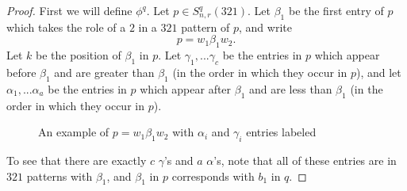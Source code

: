 \documentclass[11pt]{amsart}
\theoremstyle{remark}
\numberwithin{equation}{section}
\begin{document}
\begin{proof}
    First we will define $\phi^q$. Let $p \in S_{n,r}^{q}(321)$. Let $\beta_1$ be the first entry of $p$ which takes the role of a $2$ in a $321$ pattern of $p$, and write 
    \[
    p = w_1 \beta_1 w_2.
    \]
     Let $k$ be the position of $\beta_1$ in $p$. Let $\gamma_1, ... \gamma_c$ be the entries in $p$ which appear before $\beta_1$ and are greater than $\beta_1$ (in the order in which they occur in $p$), and let $\alpha_1, ... \alpha_a$ be the entries in $p$ which appear after $\beta_1$ and are less than $\beta_1$ (in the order in which they occur in $p$).
     \begin{figure}[H]
        \caption{An example of $p = w_1\beta_1 w_2$ with $\alpha_i$ and $\gamma_i$ entries labeled}
     \end{figure}
     
     To see that there are exactly $c$ $\gamma$'s and $a$ $\alpha$'s, note that all of these entries are in $321$ patterns with $\beta_1$, and $\beta_1$ in $p$ corresponds with $b_1$ in $q$. 
     

\end{proof}
\end{document}
